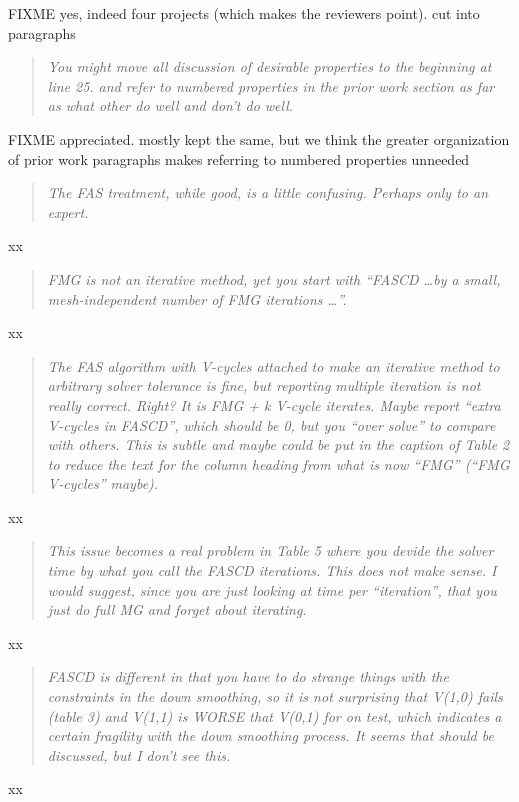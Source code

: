 \documentclass[letterpaper,final,12pt,reqno]{amsart}
\newenvironment{review}%
{\bigskip \par \begin{quote} \selectfont \sl}%
{\end{quote}}
\newcommand\short[1]{\medskip\noindent #1}   %
\begin{document}
\short{FIXME yes, indeed four projects (which makes the reviewers point). cut into paragraphs}

\begin{review}
You might move all discussion of desirable properties to the beginning at line 25. and refer to numbered properties in the prior work section as far as what other do well and don't do well.
\end{review}

\short{FIXME appreciated.  mostly kept the same, but we think the greater organization of prior work paragraphs makes referring to numbered properties unneeded}

\begin{review}
The FAS treatment, while good, is a little confusing.  Perhaps only to an expert.
\end{review}

\short{xx}

\begin{review}
FMG is not an iterative method, yet you start with ``FASCD \dots by a small, mesh-independent number of FMG iterations \dots''.
\end{review}

\short{xx}

\begin{review}
The FAS algorithm with V-cycles attached to make an iterative method to arbitrary solver tolerance is fine, but reporting multiple iteration is not really correct.  Right?  It is FMG + k V-cycle iterates.  Maybe report ``extra V-cycles in FASCD'', which should be 0, but you ``over solve'' to compare with others.  This is subtle and maybe could be put in the caption of Table 2 to reduce the text for the column heading from what is now ``FMG'' (``FMG V-cycles'' maybe).
\end{review}

\short{xx}


\begin{review}
This issue becomes a real problem in Table 5 where you devide the solver time by what you call the FASCD iterations.  This does not make sense. I would suggest, since you are just looking at time per ``iteration'', that you just do full MG and forget about iterating.
\end{review}

\short{xx}

\begin{review}
FASCD is different in that you have to do strange things with the constraints in the down smoothing, so it is not surprising that V(1,0) fails (table 3) and V(1,1) is WORSE that V(0,1) for on test, which indicates a certain fragility with the down smoothing process. It seems that should be discussed, but I don't see this.
\end{review}

\short{xx}
\end{document}
